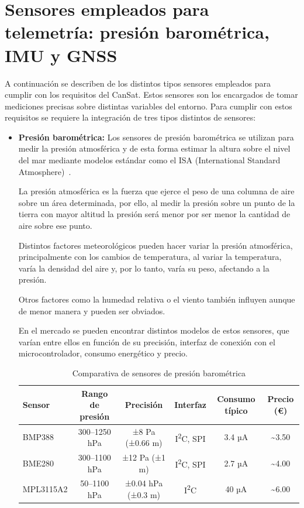 \section{Sensores empleados para telemetría: presión barométrica, IMU y GNSS}
A continuación se describen de los distintos tipos sensores empleados para cumplir con los requisitos del CanSat.
Estos sensores son los encargados de tomar mediciones precisas sobre distintas variables del entorno.
Para cumplir con estos requisitos se requiere la integración de tres tipos distintos de sensores:
\begin{itemize}
    \item \textbf{Presión barométrica:} Los sensores de presión barométrica se utilizan para medir la presión atmosférica y de esta forma estimar la altura sobre el nivel del mar mediante modelos estándar como el ISA (International Standard Atmosphere)~\cite{skybrary_isa}.

    La presión atmosférica es la fuerza que ejerce el peso de una columna de aire sobre un área determinada,
    por ello, al medir la presión sobre un punto de la tierra con mayor altitud la presión será menor por ser menor la cantidad de aire sobre ese punto.

    Distintos factores meteorológicos pueden hacer variar la presión atmosférica, principalmente con los cambios de temperatura,
    al variar la temperatura, varía la densidad del aire y, por lo tanto, varía su peso, afectando a la presión.

    Otros factores como la humedad relativa o el viento también influyen aunque de menor manera y pueden ser obviados.

    En el mercado se pueden encontrar distintos modelos de estos sensores, que varían entre ellos en función de su precisión, interfaz de conexión con el microcontrolador, consumo energético y precio.
    \begin{table}[h]
        \centering
        \footnotesize
        \begin{tabular}{|l|c|c|c|c|c|}
            \hline
            \textbf{Sensor} & \textbf{Rango de presión} & \textbf{Precisión} & \textbf{Interfaz}          & \textbf{Consumo típico} & \textbf{Precio (€)} \\
            \hline
            BMP388          & 300–1250 hPa              & ±8 Pa (±0.66 m)    & I\textsuperscript{2}C, SPI & 3.4 µA                  & \textasciitilde3.50 \\
            \hline
            BME280          & 300–1100 hPa              & ±12 Pa (±1 m)      & I\textsuperscript{2}C, SPI & 2.7 µA                  & \textasciitilde4.00 \\
            \hline
            MPL3115A2       & 50–1100 hPa               & ±0.04 hPa (±0.3 m) & I\textsuperscript{2}C      & 40 µA                   & \textasciitilde6.00 \\
            \hline
        \end{tabular}
        \caption{Comparativa de sensores de presión barométrica}
        \label{tab:barometric_sensors}
    \end{table}



\end{itemize}
